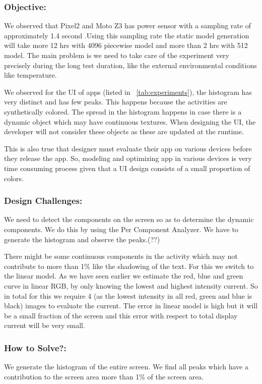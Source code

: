 \subsubsection{Objective:}
We observed that Pixel2 and Moto Z3 has power sensor with a sampling rate of approximately
1.4 second .Using this sampling rate the static model generation will take
more 12 hrs with 4096 piecewise model and more than 2 hrs with 512 model.
The main problem is we need to take care of the experiment very
precisely during the long test duration, like the external environmental conditions like temperature.

We observed for the UI of apps (listed in ~\ref{tab:experiments}), the histogram has very distinct and
has few peaks. This happens because the activities are synthetically colored.
The spread in the histogram happens in case there is a
dynamic object which may have continuous textures. When designing
the UI, the developer will not consider these objects as these are updated
at the runtime.

This is also true that designer must evaluate their app on various devices
before they release the app. So, modeling and optimizing app in various devices is very time
consuming process given that a UI design consists of a small proportion of colors.

\subsubsection{Design Challenges:}
We need to detect the components on the screen so as to determine
the dynamic components. We do this by using the Per Component Analyzer.
We have to generate the histogram and observe the peaks.(??)

There might be some continuous components in the activity which may not contribute
to more than 1\% like the shadowing of the text. For this we switch to the linear model.
As we have seen earlier we estimate the red, blue and green curve in linear RGB,
by only knowing the lowest and highest intensity current. So in total for this we
require 4 (as the lowest intensity in all red, green and blue is black) images to evaluate the current.
The error in linear model is high but it will be a small fraction of the screen and
this error with respect to total display current will be very small.

\subsubsection{How to Solve?:}
We generate the histogram of the entire screen. We find all peaks which have
a contribution to the screen area more than 1\% of the screen area.

